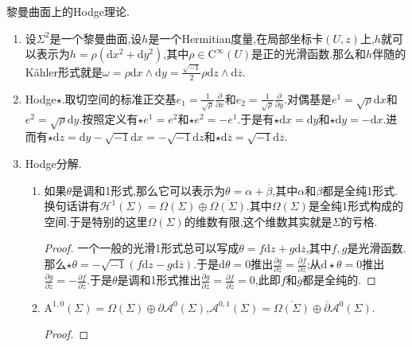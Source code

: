 黎曼曲面上的Hodge理论.
\begin{enumerate}
	\item 设$\Sigma^2$是一个黎曼曲面,设$h$是一个Hermitian度量,在局部坐标卡$(U,z)$上,$h$就可以表示为$h=\rho(\mathrm{d}x^2+\mathrm{d}y^2)$,其中$\rho\in\mathrm{C}^{\infty}(U)$是正的光滑函数.那么和$h$伴随的K\"ahler形式就是$\omega=\rho\mathrm{d}x\wedge\mathrm{d}y=\frac{\sqrt{-1}}{2}\rho\mathrm{d}z\wedge\mathrm{d}\overline{z}$.
	\item Hodge$\star$.取切空间的标准正交基$e_1=\frac{1}{\sqrt{\rho}}\frac{\partial}{\partial x}$和$e_2=\frac{1}{\sqrt{\rho}}\frac{\partial}{\partial y}$.对偶基是$e^1=\sqrt{\rho}\mathrm{d}x$和$e^2=\sqrt{\rho}\mathrm{d}y$.按照定义有$\star e^1=e^2$和$\star e^2=-e^1$.于是有$\star\mathrm{d}x=\mathrm{d}y$和$\star\mathrm{d}y=-\mathrm{d}x$.进而有$\star\mathrm{d}z=\mathrm{d}y-\sqrt{-1}\mathrm{d}x=-\sqrt{-1}\mathrm{d}z$和$\star\mathrm{d}\overline{z}=\sqrt{-1}\mathrm{d}\overline{z}$.
	\item Hodge分解.
	\begin{enumerate}
		\item 如果$\theta$是调和1形式,那么它可以表示为$\theta=\alpha+\overline{\beta}$,其中$\alpha$和$\beta$都是全纯1形式.换句话讲有$\mathscr{H}^1(\Sigma)=\Omega(\Sigma)\oplus\overline{\Omega(\Sigma)}$.其中$\Omega(\Sigma)$是全纯1形式构成的空间.于是特别的这里$\Omega(\Sigma)$的维数有限,这个维数其实就是$\Sigma$的亏格.
		\begin{proof}
			
			一个一般的光滑1形式总可以写成$\theta=f\mathrm{d}z+g\mathrm{d}\overline{z}$,其中$f,g$是光滑函数.那么$\star\theta=-\sqrt{-1}(f\mathrm{d}z-g\mathrm{d}\overline{z})$.于是$\mathrm{d}\theta=0$推出$\frac{\partial g}{\partial z}=\frac{\partial f}{\partial\overline{z}}$;从$\mathrm{d}\star\theta=0$推出$\frac{\partial g}{\partial z}=-\frac{\partial f}{\partial\overline{z}}$.于是$\theta$是调和1形式推出$\frac{\partial g}{\partial z}=\frac{\partial f}{\partial\overline{z}}=0$,此即$f$和$\overline{g}$都是全纯的.
		\end{proof}
		\item $\mathrm{A}^{1,0}(\Sigma)=\Omega(\Sigma)\oplus\partial\mathscr{A}^0(\Sigma)$,$\mathscr{A}^{0,1}(\Sigma)=\overline{\Omega(\Sigma)}\oplus\overline{\partial}\mathscr{A}^0(\Sigma)$.
		\begin{proof}
			

\end{proof}
\end{enumerate}
\end{enumerate}
